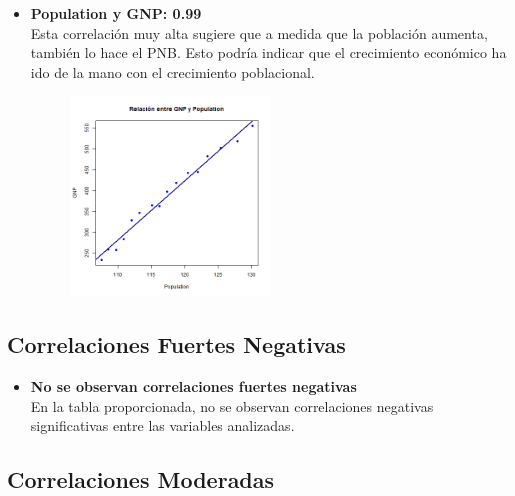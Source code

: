 \documentclass{article}
\begin{document}
\begin{itemize}
        \item \textbf{Population y GNP: 0.99} \\
        Esta correlación muy alta sugiere que a medida que la población aumenta, también lo hace el PNB. Esto podría indicar que el crecimiento económico ha ido de la mano con el crecimiento poblacional.
    
                
        \begin{figure}[H]
            \centering
            \includegraphics[width=0.5\textwidth]{GraficosDispersion/Population_vs_GNP.png}
            \label{fig:Population_vs_GNP}
            \vspace{0.5cm} %
        \end{figure}
    
    \end{itemize}
    
    \subsection{Correlaciones Fuertes Negativas}
    
    \begin{itemize}
        \item \textbf{No se observan correlaciones fuertes negativas} \\
        En la tabla proporcionada, no se observan correlaciones negativas significativas entre las variables analizadas.
    \end{itemize}
    
    \subsection{Correlaciones Moderadas}
    
\end{document}
